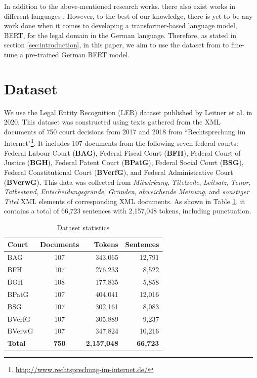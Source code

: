 \documentclass[a4paper,twoside]{article}
\begin{document}
In addition to the above-mentioned research works, there also exist works in different languages \cite{souza2019portuguese,zanuz2022fostering}. However, to the best of our knowledge, there is yet to be any work done when it comes to developing a transformer-based language model, BERT, for the legal domain in the German language. Therefore, as stated in section \ref{sec:introduction}, in this paper, we aim to use the dataset from \cite{leitner2020dataset} to fine-tune a pre-trained German BERT model.

\section{Dataset}
\label{sec:dataset}

We use the Legal Entity Recognition (LER) dataset published by Leitner et al. in 2020. This dataset was constructed using texts gathered from the XML documents of 750 court decisions from 2017 and 2018 from ``Rechtsprechung im Internet"\footnote{\url{http://www.rechtsprechung-im-internet.de/}}. It includes 107 documents from the following seven federal courts: Federal Labour Court (\textbf{BAG}), Federal Fiscal Court (\textbf{BFH}), Federal Court of Justice (\textbf{BGH}), Federal Patent Court (\textbf{BPatG}), Federal Social Court (\textbf{BSG}), Federal Constitutional Court (\textbf{BVerfG}), and Federal Administrative Court (\textbf{BVerwG}). This data was collected from \textit{Mitwirkung}, \textit{Titelzeile}, \textit{Leitsatz}, \textit{Tenor}, \textit{Tatbestand}, \textit{Entscheidungsgründe}, \textit{Gründen}, \textit{abweichende Meinung}, and \textit{sonstiger Titel} XML elements of corresponding XML documents. As shown in Table \ref{tab:dataset}, it contains a total of 66,723 sentences with 2,157,048 tokens, including punctuation.

\begin{table}[h]
\centering
\begin{tabular}{lcrr}
\hline
\textbf{Court} & \textbf{Documents} & \textbf{Tokens} & \textbf{Sentences}\\
\hline
BAG & 107 & 343,065 & 12,791 \\
BFH & 107 & 276,233 & 8,522 \\
BGH & 108 & 177,835 & 5,858 \\
BPatG & 107 & 404,041 & 12,016 \\
BSG & 107 & 302,161 & 8,083 \\
BVerfG & 107 & 305,889 & 9,237 \\
BVerwG & 107 & 347,824 & 10,216 \\
\hline
\textbf{Total} & \textbf{750} & \textbf{2,157,048} & \textbf{66,723} \\
\hline
\end{tabular}
\caption{Dataset statistics \cite{leitner2020dataset}}
\label{tab:dataset}
\end{table}
\end{document}
